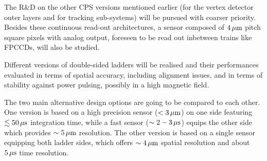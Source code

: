 The R\&D on the other CPS versions mentioned earlier (for the vertex
detector outer layers and for tracking sub-systems) will be pursued
with coarser priority.
Besides these continuous read-out architectures, a sensor composed
of $\unit[4]{\mu m}$ pitch square pixels with analog output, foreseen to be
read out inbetween trains like FPCCDs, will also be studied.


Different versions of double-sided ladders will be realised and
their performances evaluated in terms of spatial accuracy, including
alignment issues, and in terms of stability against power pulsing,
possibly in a high magnetic field.

The two main alternative design options are going to be compared
to each other. One version is based on a high precision sensor
($<\unit[3]{\mu m}$) on one side featuring $\lesssim\unit[50]{\mu s}$ integration
time, while a fast sensor ($\sim\unit[2-3]{\mu s}$) equips the other side
which provides $\sim\unit[5]{\mu m}$ resolution. The other version is based
on a single sensor equipping both ladder sides, which offers $\sim\unit[4]{\mu m}$
spatial resolution and about $\unit[5]{\mu s}$ time resolution.
